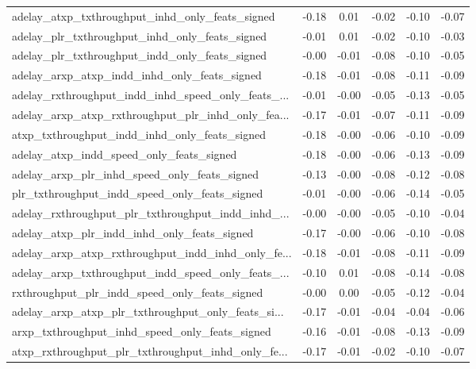 \begin{tabular}{|l|*{4}{c}|r|}
adelay\_atxp\_txthroughput\_inhd\_only\_feats\_signed    & -0.18 &  0.01 &   -0.02 &      -0.10 & -0.07 \\
adelay\_plr\_txthroughput\_inhd\_only\_feats\_signed     & -0.01 &  0.01 &   -0.02 &      -0.10 & -0.03 \\
adelay\_plr\_txthroughput\_indd\_only\_feats\_signed     & -0.00 & -0.01 &   -0.08 &      -0.10 & -0.05 \\
adelay\_arxp\_atxp\_indd\_inhd\_only\_feats\_signed       & -0.18 & -0.01 &   -0.08 &      -0.11 & -0.09 \\
adelay\_rxthroughput\_indd\_inhd\_speed\_only\_feats\_... & -0.01 & -0.00 &   -0.05 &      -0.13 & -0.05 \\
adelay\_arxp\_atxp\_rxthroughput\_plr\_inhd\_only\_fea... & -0.17 & -0.01 &   -0.07 &      -0.11 & -0.09 \\
atxp\_txthroughput\_indd\_inhd\_only\_feats\_signed      & -0.18 & -0.00 &   -0.06 &      -0.10 & -0.09 \\
adelay\_atxp\_indd\_speed\_only\_feats\_signed           & -0.18 & -0.00 &   -0.06 &      -0.13 & -0.09 \\
adelay\_arxp\_plr\_inhd\_speed\_only\_feats\_signed       & -0.13 & -0.00 &   -0.08 &      -0.12 & -0.08 \\
plr\_txthroughput\_indd\_speed\_only\_feats\_signed      & -0.01 & -0.00 &   -0.06 &      -0.14 & -0.05 \\
adelay\_rxthroughput\_plr\_txthroughput\_indd\_inhd\_... & -0.00 & -0.00 &   -0.05 &      -0.10 & -0.04 \\
adelay\_atxp\_plr\_indd\_inhd\_only\_feats\_signed        & -0.17 & -0.00 &   -0.06 &      -0.10 & -0.08 \\
adelay\_arxp\_atxp\_rxthroughput\_indd\_inhd\_only\_fe... & -0.18 & -0.01 &   -0.08 &      -0.11 & -0.09 \\
adelay\_arxp\_txthroughput\_indd\_speed\_only\_feats\_... & -0.10 &  0.01 &   -0.08 &      -0.14 & -0.08 \\
rxthroughput\_plr\_indd\_speed\_only\_feats\_signed      & -0.00 &  0.00 &   -0.05 &      -0.12 & -0.04 \\
adelay\_arxp\_atxp\_plr\_txthroughput\_only\_feats\_si... & -0.17 & -0.01 &   -0.04 &      -0.04 & -0.06 \\
arxp\_txthroughput\_inhd\_speed\_only\_feats\_signed     & -0.16 & -0.01 &   -0.08 &      -0.13 & -0.09 \\
atxp\_rxthroughput\_plr\_txthroughput\_inhd\_only\_fe... & -0.17 & -0.01 &   -0.02 &      -0.10 & -0.07 \\

\end{tabular}
